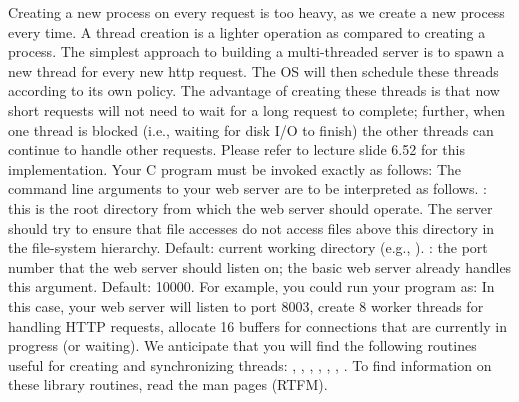 {}\markdownRendererInterblockSeparator
{}Creating a new process on every request is too heavy, as we create a new process every time. A thread creation is a lighter operation as compared to creating a process. The simplest approach to building a multi-threaded server is to spawn a new thread for every new http request. The OS will then schedule these threads according to its own policy. The advantage of creating these threads is that now short requests will not need to wait for a long request to complete; further, when one thread is blocked (i.e., waiting for disk I/O to finish) the other threads can continue to handle other requests. Please refer to lecture slide 6.52 for this implementation. \markdownRendererInterblockSeparator
{}\markdownRendererInterblockSeparator
{}Your C program must be invoked exactly as follows:\markdownRendererInterblockSeparator
{}\markdownRendererInterblockSeparator
{}The command line arguments to your web server are to be interpreted as follows.\markdownRendererInterblockSeparator
{}\markdownRendererUlBeginTight
\markdownRendererUlItem {}: this is the root directory from which the web server should operate. The server should try to ensure that file accesses do not access files above this directory in the file-system hierarchy. Default: current working directory (e.g., ).\markdownRendererUlItemEnd 
\markdownRendererUlItem {}: the port number that the web server should listen on; the basic web server already handles this argument. Default: 10000.\markdownRendererUlItemEnd 
\markdownRendererUlEndTight \markdownRendererInterblockSeparator
{}For example, you could run your program as: \markdownRendererInterblockSeparator
{}In this case, your web server will listen to port 8003, create 8 worker threads for handling HTTP requests, allocate 16 buffers for connections that are currently in progress (or waiting).\markdownRendererInterblockSeparator
{}\markdownRendererInterblockSeparator
{}We anticipate that you will find the following routines useful for creating and synchronizing threads: , , , , , , . To find information on these library routines, read the man pages (RTFM). \markdownRendererInterblockSeparator
